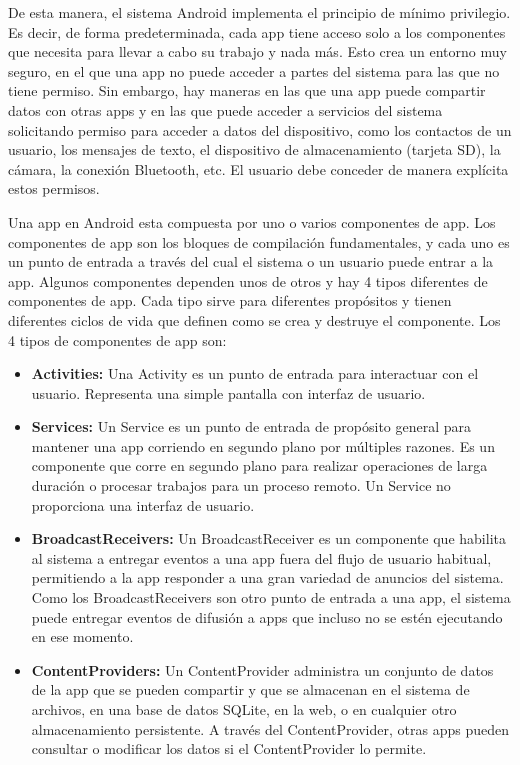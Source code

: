 De esta manera, el sistema Android implementa el principio de mínimo privilegio. Es decir, de forma predeterminada, cada app tiene acceso solo a los componentes que necesita para llevar a cabo su trabajo y nada más. Esto crea un entorno muy seguro, en el que una app no puede acceder a partes del sistema para las que no tiene permiso. Sin embargo, hay maneras en las que una app puede compartir datos con otras apps y en las que puede acceder a servicios del sistema solicitando permiso para acceder a datos del dispositivo, como los contactos de un usuario, los mensajes de texto, el dispositivo de almacenamiento (tarjeta SD), la cámara, la conexión Bluetooth, etc. El usuario debe conceder de manera explícita estos permisos.

Una app en Android esta compuesta por uno o varios componentes de app. Los componentes de app son los bloques de compilación fundamentales, y cada uno es un punto de entrada a través del cual el sistema o un usuario puede entrar a la app. Algunos componentes dependen unos de otros y hay 4 tipos diferentes de componentes de app. Cada tipo sirve para diferentes propósitos y tienen diferentes ciclos de vida que definen como se crea y destruye el componente. Los 4 tipos de componentes de app son:

\begin{itemize}
	\item \textbf{Activities:} Una Activity es un punto de entrada para interactuar con el usuario. Representa una simple pantalla con interfaz de usuario.
	
	\item \textbf{Services:} Un Service es un punto de entrada de propósito general para mantener una app corriendo en segundo plano por múltiples razones. Es un componente que corre en segundo plano para realizar operaciones de larga duración o procesar trabajos para un proceso remoto. Un Service no proporciona una interfaz de usuario.
	
	\item \textbf{BroadcastReceivers:} Un BroadcastReceiver es un componente que habilita al sistema a entregar eventos a una app fuera del flujo de usuario habitual, permitiendo a la app responder a una gran variedad de anuncios del sistema. Como los BroadcastReceivers son otro punto de entrada a una app, el sistema puede entregar eventos de difusión a apps que incluso no se estén ejecutando en ese momento.
	
	
	\item \textbf{ContentProviders:} Un ContentProvider administra un conjunto de datos de la app que se pueden compartir y que se almacenan en el sistema de archivos, en una base de datos SQLite, en la web, o en cualquier otro almacenamiento persistente. A través del ContentProvider, otras apps pueden consultar o modificar los datos si el ContentProvider lo permite.
	
	
\end{itemize}

